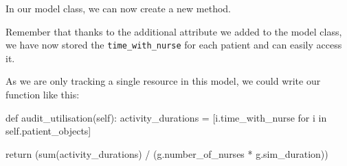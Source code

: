 \documentclass[
  letterpaper,
  DIV=11,
  numbers=noendperiod]{scrreprt}
\newenvironment{Shaded}{}{}
\newcommand{\BuiltInTok}[1]{\textcolor[rgb]{0.84,0.23,0.29}{#1}}
\newcommand{\ControlFlowTok}[1]{\textcolor[rgb]{0.84,0.23,0.29}{#1}}
\newcommand{\KeywordTok}[1]{\textcolor[rgb]{0.84,0.23,0.29}{#1}}
\newcommand{\NormalTok}[1]{\textcolor[rgb]{0.14,0.16,0.18}{#1}}
\newcommand{\OperatorTok}[1]{\textcolor[rgb]{0.14,0.16,0.18}{#1}}
\newcommand{\VariableTok}[1]{\textcolor[rgb]{0.89,0.38,0.04}{#1}}
\begin{document}
In our model class, we can now create a new method.

Remember that thanks to the additional attribute we added to the model
class, we have now stored the \texttt{time\_with\_nurse} for each
patient and can easily access it.

As we are only tracking a single resource in this model, we could write
our function like this:

\begin{Shaded}
\begin{Highlighting}[]
\KeywordTok{def}\NormalTok{ audit\_utilisation(}\VariableTok{self}\NormalTok{):}
\NormalTok{    activity\_durations }\OperatorTok{=}\NormalTok{ [i.time\_with\_nurse }\ControlFlowTok{for}\NormalTok{ i }\KeywordTok{in} \VariableTok{self}\NormalTok{.patient\_objects]}

    \ControlFlowTok{return}\NormalTok{ (}\BuiltInTok{sum}\NormalTok{(activity\_durations) }\OperatorTok{/}\NormalTok{ (g.number\_of\_nurses }\OperatorTok{*}\NormalTok{ g.sim\_duration))}
\end{Highlighting}
\end{Shaded}
\end{document}
